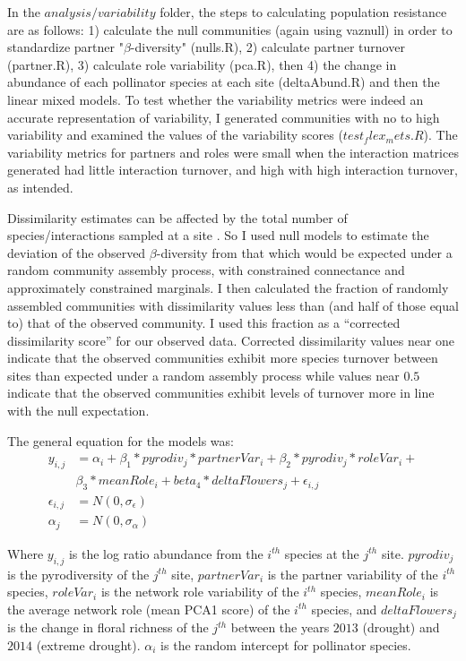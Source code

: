 \documentclass{article}\usepackage[]{graphicx}\usepackage[]{color}
\begin{document}
In the $analysis/variability$ folder, the steps to calculating
population resistance are as follows: 1) calculate the null
communities (again using vaznull) in order to standardize partner
"$\beta$-diversity" (nulls.R), 2) calculate partner turnover
(partner.R), 3) calculate role variability (pca.R), then 4) the change
in abundance of each pollinator species at each site (deltaAbund.R)
and then the linear mixed models. To test whether the variability
metrics were indeed an accurate representation of variability, I
generated communities with no to high variability and examined the
values of the variability scores ($test_flex_mets.R$). The variability
metrics for partners and roles were small when the interaction
matrices generated had little interaction turnover, and high with high
interaction turnover, as intended.

Dissimilarity estimates can be affected by the total number of
species/interactions sampled at a site \citep[e.g.,][]{Chase2011}. So
I used null models to estimate the deviation of the observed
$\beta$-diversity from that which would be expected under a random
community assembly process, with constrained connectance and
approximately constrained marginals.  I then calculated the fraction
of randomly assembled communities with dissimilarity values less than
(and half of those equal to) that of the observed community. I used
this fraction as a ``corrected dissimilarity score'' for our observed
data.  Corrected dissimilarity values near one indicate that the
observed communities exhibit more species turnover between sites than
expected under a random assembly process while values near $0.5$
indicate that the observed communities exhibit levels of turnover more
in line with the null expectation.

The general equation for the models was: 
\begin{equation}
  \label{equ:pop_resist}
\begin{aligned}
y_{i,j} & = \alpha_i + \beta_1*pyrodiv_j*partnerVar_i +
\beta_2*pyrodiv_j*roleVar_i + \\
& \beta_3*meanRole_i + 
beta_4*deltaFlowers_j + \epsilon_{i,j} \\
\epsilon_{i,j} & = N(0, \sigma_{\epsilon}) \\
\alpha_j & = N(0, \sigma_{\alpha})
\end{aligned}
\end{equation}

Where $y_{i,j}$ is the log ratio abundance from the $i^{th}$ species
at the $j^{th}$ site. $pyrodiv_j$ is the pyrodiversity of the $j^{th}$
site, $partnerVar_i$ is the partner variability of the $i^{th}$
species, $roleVar_i$ is the network role variability of the $i^{th}$
species, $meanRole_i$ is the average network role (mean PCA1 score) of
the $i^{th}$ species, and $deltaFlowers_j$ is the change in floral
richness of the $j^{th}$ between the years $2013$ (drought) and $2014$
(extreme drought).  $\alpha_i$ is the random intercept for pollinator
species.
\end{document}
